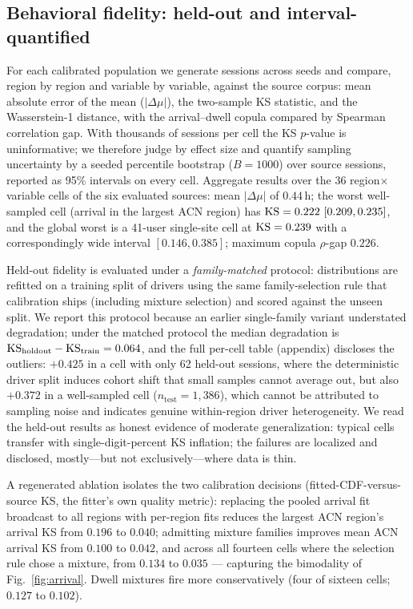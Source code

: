 \subsection{Behavioral fidelity: held-out and interval-quantified}
\label{sec:behfidelity}

For each calibrated population we generate sessions across seeds and compare,
region by region and variable by variable, against the source corpus: mean
absolute error of the mean ($|\Delta\mu|$), the two-sample KS statistic, and
the Wasserstein-1 distance, with the arrival--dwell copula compared by
Spearman correlation gap. With thousands of sessions per cell the KS
$p$-value is uninformative; we therefore judge by effect size and quantify
sampling uncertainty by a seeded percentile bootstrap ($B{=}1000$) over
source sessions, reported as 95\% intervals on every cell. Aggregate
results over the 36 region$\times$variable cells of the six evaluated
sources: mean $|\Delta\mu|$ of $0.44$\,h; the worst well-sampled cell
(arrival in the largest ACN region) has $\mathrm{KS} = 0.222\ [0.209, 0.235]$, and
the global worst is a 41-user single-site cell at $\mathrm{KS} = 0.239$ with a
correspondingly wide interval $[0.146, 0.385]$; maximum copula $\rho$-gap
$0.226$.

Held-out fidelity is evaluated under a \emph{family-matched} protocol:
distributions are refitted on a training split of drivers using the same
family-selection rule that calibration ships (including mixture selection)
and scored against the unseen split. We report this protocol because an
earlier single-family variant understated degradation; under the matched
protocol the median degradation is
$\mathrm{KS}_{\text{holdout}} - \mathrm{KS}_{\text{train}} = 0.064$, and the full per-cell
table (appendix) discloses the outliers: $+0.425$ in a cell with only 62
held-out sessions, where the deterministic driver split induces cohort
shift that small samples cannot average out, but also $+0.372$ in a
well-sampled cell ($n_{\text{test}} = 1{,}386$), which cannot be attributed
to sampling noise and indicates genuine within-region driver heterogeneity.
We read the held-out results as honest evidence of moderate generalization:
typical cells transfer with single-digit-percent KS inflation; the failures
are localized and disclosed, mostly---but not exclusively---where data is
thin.

A regenerated ablation isolates the two calibration decisions
(fitted-CDF-versus-source KS, the fitter's own quality metric): replacing the
pooled arrival fit broadcast to all regions with per-region fits reduces the
largest ACN region's arrival KS from $0.196$ to $0.040$; admitting mixture
families improves mean ACN arrival KS from $0.100$ to $0.042$, and across
all fourteen cells where the selection rule chose a mixture, from $0.134$ to
$0.035$ --- capturing the bimodality of Fig.~\ref{fig:arrival}. Dwell
mixtures fire more conservatively (four of sixteen cells; $0.127$ to
$0.102$).

